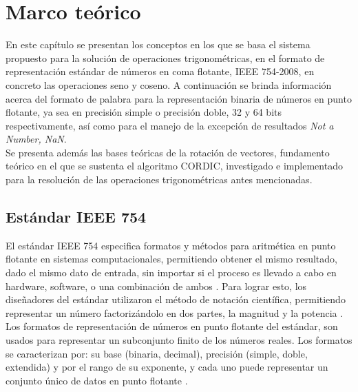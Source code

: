 \chapter{Marco teórico}
\label{ch:marco}


En este capítulo se presentan los conceptos en los que se basa el sistema propuesto para la solución de operaciones trigonométricas, en el formato de representación estándar de números en coma flotante, IEEE 754-2008, en concreto las operaciones seno y coseno. A continuación se brinda información acerca del formato de palabra para la representación binaria de números en punto flotante, ya sea en precisión simple o precisión doble, 32 y 64 bits respectivamente, así como para el manejo de la excepción de resultados \textit{Not a Number, NaN}.\\

Se presenta además las bases teóricas de la rotación de vectores, fundamento teórico en el que se sustenta el algoritmo CORDIC, investigado e implementado para la resolución de las operaciones trigonométricas antes mencionadas.\\


\section{Estándar IEEE 754}

El estándar IEEE 754 especifica formatos y métodos para aritmética en punto flotante en sistemas computacionales, permitiendo obtener el mismo resultado, dado el mismo dato de entrada, sin importar si el proceso es llevado a cabo en hardware, software, o una combinación de ambos \cite{IEEE754}. Para lograr esto, los diseñadores del estándar utilizaron el método de notación científica, permitiendo representar un número factorizándolo en dos partes, la magnitud y la potencia \cite{IEEE754_WEB}.\\

Los formatos de representación de números en punto flotante del estándar, son usados para representar un subconjunto finito de los números reales. Los formatos se caracterizan por: su base (binaria, decimal), precisión (simple, doble, extendida) y por el rango de su exponente, y cada uno puede representar un conjunto único de datos en punto flotante \cite{IEEE754}.\\

